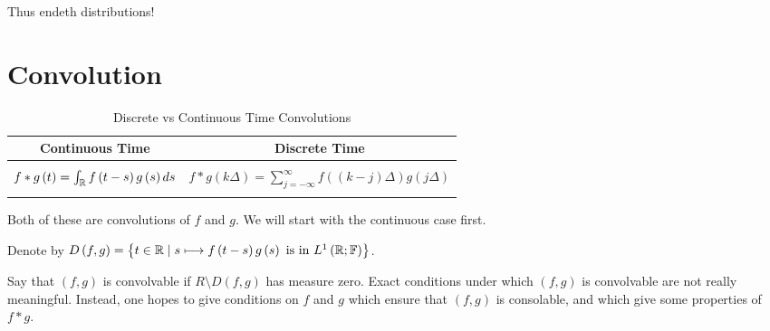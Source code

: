 Thus endeth distributions!

\section{Convolution}

\begin{table}[htpb]
	\centering
	\caption{Discrete vs Continuous Time Convolutions}
	\label{tab:convolutions}
	\begin{tabular}{ || c c || }
		\hline
	 Continuous Time & Discrete Time \\
	 \hline \hline\\ 
	 $f * g\left( t \right)  = \int_{\mathbb{R}}^{ } f \left( t - s  \right) g\left( s \right) ds $  & $f * g \left( k \Delta \right) = \sum_{j = -\infty}^{\infty} f \left( \left( k - j  \right) \Delta \right) g \left( j\Delta \right) $\\
	 \\
	 \hline
	\end{tabular}
\end{table}

Both of these are convolutions of $f $ and $g$. We will start with the continuous case first. 

Denote by $D \left( f, g \right)  = \left\{ t \in  \mathbb{R}  \mid  s \longmapsto f \left( t - s  \right) g \left( s \right)  \text{ is in }L^{1}\left( \mathbb{R}; \mathbb{F} \right)  \right\} $. 

Say that $\left( f, g \right)   $ is convolvable if $R \setminus D \left( f, g \right) $ has measure zero. Exact conditions under which $\left( f, g \right)  $ is convolvable are not really meaningful. Instead, one hopes to give conditions on $f $ and $g$ which ensure that $\left( f, g \right) $ is consolable, and which give some properties of $f * g$. 


